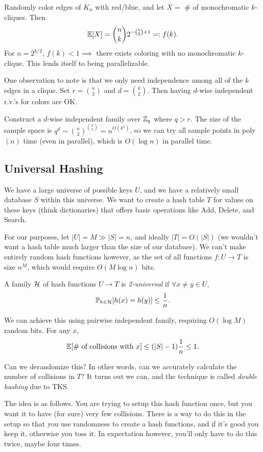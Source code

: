 \documentclass[11 pt]{scrartcl}
\begin{document}
Randomly color edges of $K_n$ with red/blue, and let $X = $ \# of monochromatic $k$-cliques. Then 
\[ \mathbb E[X] = \dbinom{n}{k} 2^{-\binom{k}{2} + 1} =: f(k).\] 
For $n = 2^{k/2}$, $f(k) < 1 \implies $ there exists coloring with no monochromatic $k$-clique. This lends itself to being parallelizable. 

One observation to note is that we only need independence among all of the $k$ edges in a clique. Set $r = \binom{n}{2}$ and $d = \binom{k}{2}$. Then having $d$-wise independent r.v.'s for colors are OK. 

Construct a $d$-wise independent family over $\mathbb Z_q$ where $q > r$. The size of the sample space is $q^d \sim \binom{n}{2}^{\binom{k}{2}} = n^{O(k^2)}$, so we can try all sample points in poly$(n)$ time (even in parallel), which is $O(\log n)$ in parallel time. 

\subsection{Universal Hashing}

We have a large universe of possible keys $U$, and we have a relatively small database $S$ within this universe. We want to create a hash table $T$ for values on these keys (think dictionaries) that offers basic operations like Add, Delete, and Search.

For our purposes, let $|U| = M \gg |S| = n$, and ideally $|T| = O(|S|)$ (we wouldn't want a hash table much larger than the size of our database). We can't make entirely random hash functions however, as the set of all functions $f: U\to T$ is size $n^M$, which would require $O(M \log n)$ bits. 

\begin{definition}
A family $\mathcal H$ of hash functions $U\to T$ is \emph{2-universal} if $\forall x\not= y \in U$, 
\[ \mathbb P_{h\in \mathcal H} [h(x) = h(y)] \leq \dfrac{1}{n}.\]
\end{definition}

We can achieve this using pairwise independent family, requiring $O(\log M)$ random bits. For any $x$, 
\[ \mathbb E[\#\text{ of collisions with }x] \leq (|S| - 1)\dfrac{1}{n} \leq 1.\] 

Can we derandomize this? In other words, can we accurately calculate the number of collisions in $T$? It turns out we can, and the technique is called \emph{double hashing} due to TKS.

The idea is as follows. You are trying to setup this hash function once, but you want it to have (for sure) very few collisions. There is a way to do this in the setup so that you use randomness to create a hash functions, and if it's good you keep it, otherwise you toss it. In expectation however, you'll only have to do this twice, maybe four times. 
\end{document}
